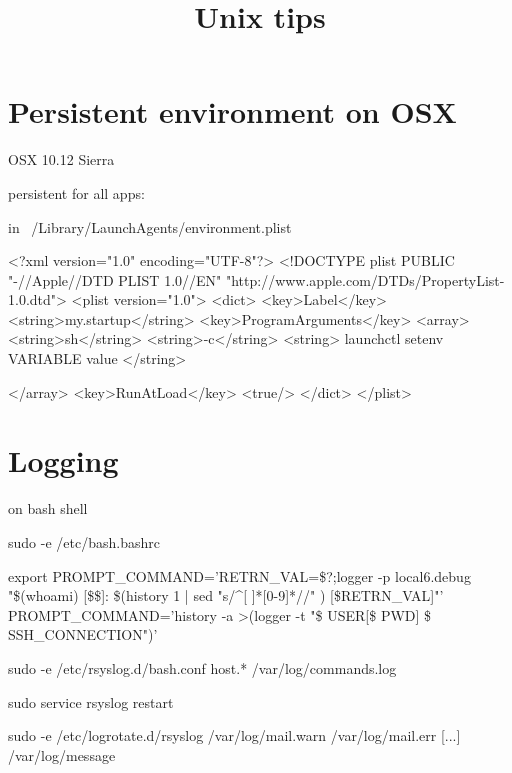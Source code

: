


\title{Unix tips}


\date{}


\maketitle

\justify

\renewcommand{\abstractname}{}

\begin{abstract}

\end{abstract}



\section*{Persistent environment on OSX}

OSX 10.12 Sierra

persistent for all apps: 

in ~/Library/LaunchAgents/environment.plist

<?xml version="1.0" encoding="UTF-8"?>
<!DOCTYPE plist PUBLIC "-//Apple//DTD PLIST 1.0//EN" "http://www.apple.com/DTDs/PropertyList-1.0.dtd">
<plist version="1.0">
<dict>
  <key>Label</key>
  <string>my.startup</string>
  <key>ProgramArguments</key>
  <array>
    <string>sh</string>
    <string>-c</string>
    <string>
    launchctl setenv VARIABLE value
  </string>

  </array>
  <key>RunAtLoad</key>
  <true/>
</dict>
</plist>




\section*{Logging}

on bash shell

sudo -e /etc/bash.bashrc

export PROMPT_COMMAND='RETRN_VAL=\$?;logger -p local6.debug "\$(whoami) [\$\$]: \$(history 1 | sed "s/^[ ]*[0-9]\+[ ]*//" ) [\$RETRN_VAL]"'
PROMPT_COMMAND='history -a >(logger -t "\$ USER[\$ PWD] \$ SSH_CONNECTION")'

sudo -e /etc/rsyslog.d/bash.conf
   host.*    /var/log/commands.log

sudo service rsyslog restart

sudo -e /etc/logrotate.d/rsyslog
/var/log/mail.warn
/var/log/mail.err
[...]
/var/log/message

